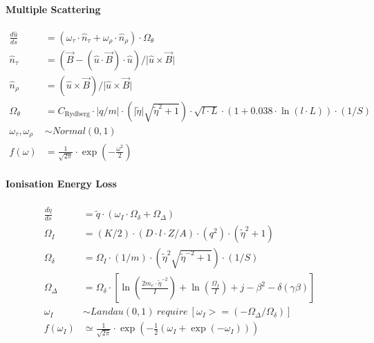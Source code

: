 \documentclass[review]{elsarticle}
\begin{document}
\paragraph{Multiple Scattering}
\begin{equation} \begin{alignedat}{-1}
    \frac{d\hat{u}}{ds}&=(\omega_{\tau}\cdot\hat{n}_{\tau}+\omega_{\rho}\cdot\hat{n}_{\rho})\cdot\Omega_{\theta} \\
    \hat{n}_{\tau}&=(\vec{B}-(\hat{u}\cdot\vec{B})\cdot\hat{u})/\bigr|\hat{u}\times\vec{B}\bigl| \\
    \hat{n}_{\rho}&=(\hat{u}\times\vec{B})/\bigr|\hat{u}\times\vec{B}\bigl| \\
    \Omega_{\theta}&=C_{\text{Rydberg}}\cdot\bigl|q/m\bigr|\cdot(\bigl|\tilde{\eta}\bigr|\sqrt{\tilde{\eta}^{2}+1})\cdot\sqrt{l\cdot L}\cdot(1+0.038\cdot\ln{(l\cdot L)})\cdot(1/S)\\
    \omega_{\tau},\omega_{\rho}&\sim Normal\left(0,1\right) \\
    f\left(\omega\right)&=\frac{1}{\sqrt{2\pi}}\cdot\exp{\left(-\frac{\omega^{2}}{2}\right)}
\end{alignedat} \end{equation} 

\paragraph{Ionisation Energy Loss}
\begin{equation} \begin{alignedat}{-1}
    \frac{d\tilde{\eta}}{ds}&=\tilde{q}\cdot\left(\omega_{I}\cdot\Omega_{\delta}+\Omega_{\Delta}\right) \\
    \Omega_{I}&=(K/2)\cdot(D\cdot l\cdot Z/A)\cdot(q^{2})\cdot(\tilde{\eta}^{2}+1) \\
    \Omega_{\delta}&=\Omega_{I}\cdot(1/m)\cdot(\tilde{\eta}^{2}\sqrt{\tilde{\eta}^{-2}+1})\cdot(1/S) \\
    \Omega_{\Delta}&=\Omega_{\delta}\cdot\left[\ln{\left(\frac{2m_{e}\cdot \tilde{\eta}^{-2}}{I}\right)}+\ln{\left(\frac{\Omega_{I}}{I}\right)}+j-{\beta}^{2}-\delta(\gamma\beta)\right] \\
    \omega_{I}&\sim Landau\left(0,1\right)\ require\ \left[\omega_{I}>=(-\Omega_{\Delta}/\Omega_{\delta})\right] \\
    f\left(\omega_{I}\right)&\simeq\frac{1}{\sqrt{2\pi}}\cdot\exp{\left(-\frac{1}{2}\left(\omega_{I}+\exp{(-\omega_{I})}\right)\right)}
\end{alignedat} \end{equation} 
\end{document}
